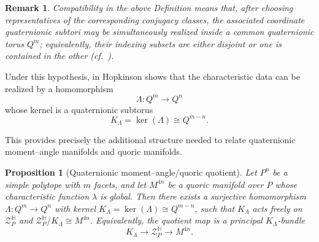 \documentclass[11pt,a4paper]{article}
\numberwithin{equation}{section}
\newtheorem{remark}[definition]{Remark}
\newtheorem{prop}[definition]{Proposition}
\theoremstyle{named}
\begin{document}
\begin{remark}
Compatibility in the above Definition means that, after choosing representatives of the corresponding conjugacy classes, the associated coordinate quaternionic subtori may be simultaneously realized inside a common quaternionic torus \(Q^m\); equivalently, their indexing subsets are either disjoint or one is contained in the other (cf.~\cite[Definition~2.1.14]{ho}).
\end{remark}

Under this hypothesis, in \cite[Corollary~5.1.4]{ho} Hopkinson shows that the characteristic data can be realized by a homomorphism
\[
\Lambda:Q^m\longrightarrow Q^n
\]
whose kernel is a quaternionic subtorus
\[
K_\Lambda=\ker(\Lambda)\cong Q^{m-n}.
\]

This provides precisely the additional structure needed to relate quaternionic moment–angle manifolds and quoric manifolds.

\begin{prop}[Quaternionic moment--angle/quoric quotient]
\label{prop:ma_quoric_quotient}
Let \(P^n\) be a simple polytope with \(m\) facets, and let \(M^{4n}\) be a quoric manifold over \(P\) whose characteristic function \(\lambda\) is global. Then there exists a surjective homomorphism $\Lambda:Q^m\longrightarrow Q^n$ with kernel $K_\Lambda=\ker(\Lambda)\cong Q^{m-n}$, such that \(K_\Lambda\) acts freely on \(\mathcal Z_P^{\mathbb H}\) and \(\mathcal Z_P^{\mathbb H}/K_\Lambda \cong M^{4n}\). Equivalently, the quotient map is a principal \(K_\Lambda\)-bundle
\[
    K_\Lambda
    \longrightarrow
    \mathcal Z_P^{\mathbb H}
    \longrightarrow
    M^{4n}.
\]
\end{prop}
\end{document}
